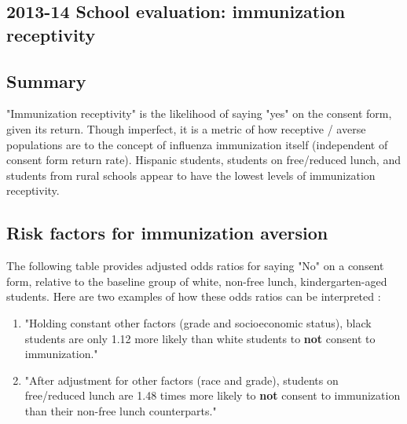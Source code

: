 \begin{center}
\section*{2013-14 School evaluation: immunization receptivity}
\end{center}
\begin{multicols}{2}


\subsection*{Summary}

"Immunization receptivity" is the likelihood of saying "yes" on the consent form, given its return.  Though imperfect, it is a metric of how receptive / averse populations are to the concept of influenza immunization itself (independent of consent form return rate).  Hispanic students, students on free/reduced lunch, and students from rural schools appear to have the lowest levels of immunization receptivity.

\subsection*{Risk factors for immunization aversion}


The following table provides adjusted odds ratios for saying "No" on a consent form, relative to the baseline group of white, non-free lunch, kindergarten-aged students. Here are two examples of how these odds ratios can be interpreted :\begin{enumerate}
\item "Holding constant other factors (grade and socioeconomic status), black students are only 1.12 more likely than white students to \textbf{not} consent to immunization."
\item "After adjustment for other factors (race and grade), students on free/reduced lunch are 1.48 times more likely to \textbf{not} consent to immunization than their non-free lunch counterparts."
\end{enumerate}





\end{multicols}
